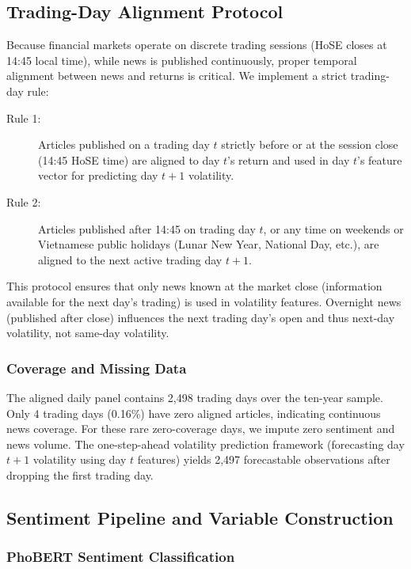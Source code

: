 \subsection{Trading-Day Alignment Protocol}

Because financial markets operate on discrete trading sessions (HoSE closes at 14:45 local time), while news is published continuously, proper temporal alignment between news and returns is critical. We implement a strict trading-day rule:

\begin{description}
    \item[Rule 1:] Articles published on a trading day $t$ strictly before or at the session close (14:45 HoSE time) are aligned to day $t$'s return and used in day $t$'s feature vector for predicting day $t+1$ volatility.
    \item[Rule 2:] Articles published after 14:45 on trading day $t$, or any time on weekends or Vietnamese public holidays (Lunar New Year, National Day, etc.), are aligned to the next active trading day $t+1$.
\end{description}

This protocol ensures that only news known at the market close (information available for the next day's trading) is used in volatility features. Overnight news (published after close) influences the next trading day's open and thus next-day volatility, not same-day volatility.

\subsubsection{Coverage and Missing Data}

The aligned daily panel contains 2,498 trading days over the ten-year sample. Only 4 trading days (0.16\%) have zero aligned articles, indicating continuous news coverage. For these rare zero-coverage days, we impute zero sentiment and news volume. The one-step-ahead volatility prediction framework (forecasting day $t+1$ volatility using day $t$ features) yields 2,497 forecastable observations after dropping the first trading day.

\subsection{Sentiment Pipeline and Variable Construction}

\subsubsection{PhoBERT Sentiment Classification}

